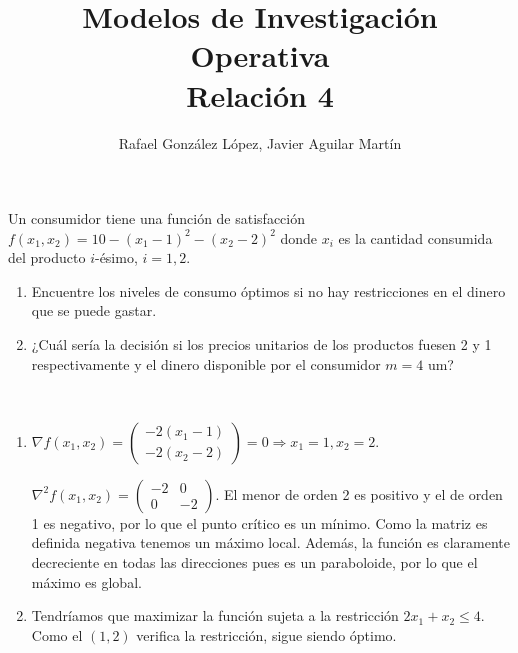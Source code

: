 \documentclass[twoside]{article}
\begin{document}
\title{Modelos de Investigación Operativa\\ Relación 4}
\author{Rafael González López, Javier Aguilar Martín}
\date{}
\maketitle

\begin{ejercicio}{1}
Un consumidor tiene una función de satisfacción $f(x_1,x_2)=10-(x_1-1)^2-(x_2-2)^2$ donde $x_i$ es la cantidad consumida del producto $i$-ésimo, $i=1,2$.
\begin{enumerate}
\item Encuentre los niveles de consumo óptimos si no hay restricciones en el dinero que se puede gastar.
\item ¿Cuál sería la decisión si los precios unitarios de los productos fuesen 2 y 1 respectivamente y el dinero disponible por el consumidor $m=4$ um?
\end{enumerate}
\begin{solucion}\
\begin{enumerate}
\item $\nabla f(x_1,x_2)=\begin{pmatrix}
-2(x_1-1)\\
-2(x_2-2)
\end{pmatrix}=0\Rightarrow x_1=1, x_2=2$. 

$\nabla^2f(x_1,x_2)=\begin{pmatrix}
-2 & 0\\
0  & -2
\end{pmatrix}$. El menor de orden 2 es positivo y el de orden 1 es negativo, por lo que el punto crítico es un mínimo. Como la matriz es definida negativa tenemos un máximo local. Además, la función es claramente decreciente en todas las direcciones pues es un paraboloide, por lo que el máximo es global. 
\item Tendríamos que maximizar la función sujeta a la restricción $2x_1+x_2\leq 4$. Como el $(1,2)$ verifica la restricción, sigue siendo óptimo.
\end{enumerate}
\end{solucion}
\end{ejercicio}
\end{document}
